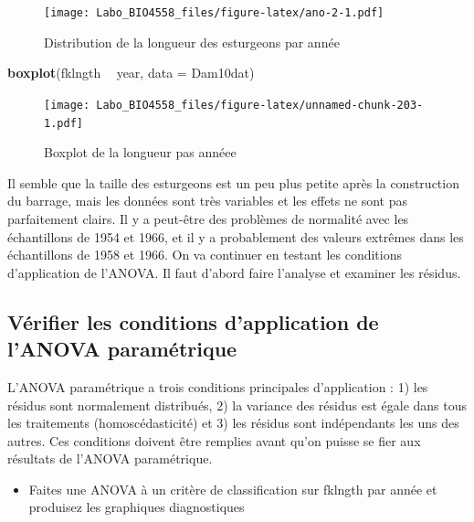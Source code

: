 \documentclass[12pt,]{book}
\newenvironment{Shaded}{\begin{snugshade}}{\end{snugshade}}
\newcommand{\DataTypeTok}[1]{\textcolor[rgb]{0.13,0.29,0.53}{#1}}
\newcommand{\KeywordTok}[1]{\textcolor[rgb]{0.13,0.29,0.53}{\textbf{#1}}}
\newcommand{\NormalTok}[1]{#1}
\newcommand{\OperatorTok}[1]{\textcolor[rgb]{0.81,0.36,0.00}{\textbf{#1}}}
\newcommand{\StringTok}[1]{\textcolor[rgb]{0.31,0.60,0.02}{#1}}
\providecommand{\tightlist}{%
  \setlength{\itemsep}{0pt}\setlength{\parskip}{0pt}}
\begin{document}
\begin{figure}
\centering
\texttt{[image: Labo\_BIO4558\_files/figure-latex/ano-2-1.pdf]}
\caption{\label{fig:ano-2}Distribution de la longueur des esturgeons par année}
\end{figure}

\begin{Shaded}
\begin{Highlighting}[]
\KeywordTok{boxplot}\NormalTok{(fklngth }\OperatorTok{~}\StringTok{ }\NormalTok{year, }\DataTypeTok{data =}\NormalTok{ Dam10dat)}
\end{Highlighting}
\end{Shaded}

\begin{figure}
\centering
\texttt{[image: Labo\_BIO4558\_files/figure-latex/unnamed-chunk-203-1.pdf]}
\caption{\label{fig:unnamed-chunk-203}Boxplot de la longueur pas annéee}
\end{figure}

Il semble que la taille des esturgeons est un peu plus petite après la construction du barrage, mais les données sont très variables et les effets ne sont pas parfaitement clairs. Il y a peut-être des problèmes de normalité avec les échantillons de 1954 et 1966, et il y a probablement des valeurs extrêmes dans les échantillons de 1958 et 1966. On va continuer en testant les conditions d'application de l'ANOVA. Il faut d'abord faire l'analyse et examiner les résidus.

\hypertarget{vuxe9rifier-les-conditions-dapplication-de-lanova-paramuxe9trique}{%
\subsection{Vérifier les conditions d'application de l'ANOVA paramétrique}\label{vuxe9rifier-les-conditions-dapplication-de-lanova-paramuxe9trique}}

L'ANOVA paramétrique a trois conditions principales d'application : 1) les résidus sont normalement distribués, 2) la variance des résidus est égale dans tous les traitements (homoscédasticité) et 3) les résidus sont indépendants les uns des autres. Ces conditions doivent être remplies avant qu'on puisse se fier aux résultats de l'ANOVA paramétrique.

\begin{itemize}
\tightlist
\item
  Faites une ANOVA à un critère de classification sur fklngth par année et produisez les graphiques diagnostiques
\end{itemize}
\end{document}
